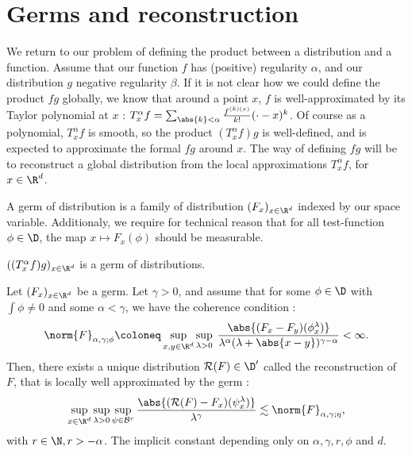 \section{Germs and reconstruction}

We return to our problem of defining the product between a distribution and a function. 
Assume that our function $f$ has (positive) regularity $\alpha$, and our distribution $g$ negative regularity $\beta$.
If it is not clear how we could define the product $fg$ globally, we know that around a point $x$, $f$ is well-approximated by its Taylor polynomial at $x$ : $T_x^\alpha f = \sum_{\abs{k}<\alpha}\frac{f^{(k)(x)}}{k!} (\cdot - x)^k$.
Of course as a polynomial, $T_x^\alpha f$ is smooth, so the product $(T_x^\alpha f) g$ is well-defined, and is expected to approximate the formal $fg$ around $x$.
The way of defining $fg$ will be to reconstruct a global distribution from the local approximations $T_x^\alpha f$, for $x \in \R^d$.

\begin{definition}
    A germ of distribution is a family of distribution $(F_x)_{x \in \R^d}$ indexed by our space variable. Additionaly, we require for technical reason that for all test-function $\phi \in \D$, the map $x\mapsto F_x(\phi)$ should be measurable.
\end{definition}

\begin{example}
    $((T_x^\alpha f)g)_{x\in \R^d}$ is a germ of distributions.
\end{example}


\begin{theorem}[Reconstruction]
    \label{thm:germ_reconstruction}
    Let $(F_x)_{x \in \R^d}$ be a germ. Let $\gamma > 0$, and assume that for some $\phi \in \D$ with $\int \phi \neq 0$ and some $\alpha < \gamma$, we have the coherence condition :
    \begin{equation}
        \label{eq:coherence1}
        \norm{F}_{\alpha,\gamma;\phi} \coloneq \sup_{x,y \in \R^d} \sup_{\lambda >0 } \; \frac{\abs{(F_x - F_y)(\phi^\lambda_x)}}{\lambda^\alpha (\lambda + \abs{x-y})^{\gamma - \alpha}} < \infty.
    \end{equation}
    Then, there exists a unique distribution $\mathcal{R}(F) \in \D'$ called the reconstruction of $F$, that is locally well approximated by the germ :
    \begin{equation*}
        \sup_{x\in \R^d} \sup_{\lambda > 0} \sup_{\psi \in \mathcal{B}^r} \frac{\abs{(\mathcal{R}(F)-F_x)(\psi_x^\lambda)}}{\lambda^\gamma} \lesssim \norm{F}_{\alpha,\gamma;\eta},
    \end{equation*}
    with $r\in \N, r>-\alpha$. The implicit constant depending only on $\alpha, \gamma, r,\phi$ and $d$.
\end{theorem}

